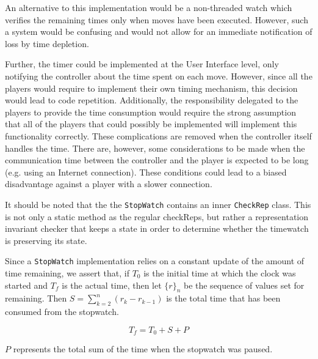 																An alternative to this implementation would be a non-threaded watch which
																verifies the remaining times only when moves have been executed. However,
																such a system would be confusing and would not allow for an immediate notification
																of loss by time depletion. 
																
																Further, the timer could be implemented at the User Interface level, only 
																notifying the controller about the time spent on each move. However, 
																since all the players would require to implement their own timing mechanism, this
																decision would lead to code repetition. Additionally, the responsibility delegated 
																to the players to provide the time consumption would require the strong assumption 
																that all of the players that could possibly be implemented will implement this 
																functionality correctly. These complications are removed when the controller itself handles 
																the time. There are, however, some considerations to be made when the communication time 
																between the controller and the player is expected to be long (e.g. using an Internet
																connection). These conditions could lead to a biased disadvantage against a player with a 
																slower connection. 
																
																
																It should be noted that the the \texttt{StopWatch} contains an inner \texttt{CheckRep}
																class. This is not only a static method as the regular checkReps, but rather a 
																representation invariant checker that keeps a state in order to determine whether
																the timewatch is preserving its state. 
																
																Since a \texttt{StopWatch} implementation relies on a constant update of 
																the amount of time remaining, we assert that, if $T_0$ is the 
																initial time at which the clock was started and $T_f$ is the actual time, 
																then let $\{r\}_n$ be the sequence of values set for remaining. Then 
																$ S = \sum_{k=2}^n ( r_k - r_{k-1} ) $ is the total time that has been
																consumed from the stopwatch.
																
																
																$$T_f = T_0 + S + P$$
																
																$P$ represents the total sum of the time when the stopwatch was paused. 
	
